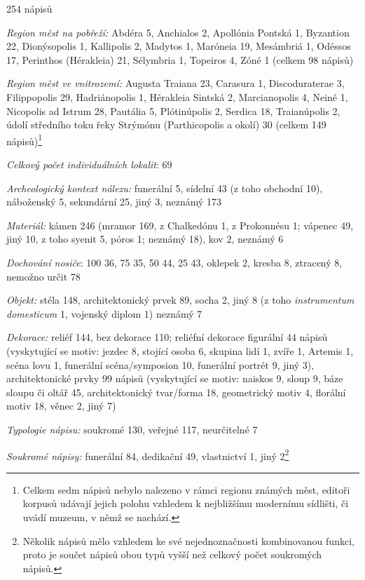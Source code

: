 \placetable[none]{}
\starttable[|l|]
\HL
{} 254 nápisů

{\em Region měst na pobřeží:} Abdéra 5, Anchialos 2, Apollónia Pontská 1, Byzantion 22, Dionýsopolis 1, Kallipolis 2, Madytos 1, Maróneia 19, Mesámbriá 1, Odéssos 17, Perinthos (Hérakleia) 21, Sélymbria 1, Topeiros 4, Zóné 1 (celkem 98 nápisů)

{\em Region měst ve vnitrozemí:} Augusta Traiana 23, Carasura 1, Discoduraterae 3, Filippopolis 29, Hadriánopolis 1, Hérakleia Sintská 2, Marcianopolis 4, Neiné 1, Nicopolis ad Istrum 28, Pautália 5, Plótinúpolis 2, Serdica 18, Traianúpolis 2, údolí středního toku řeky Strýmónu (Parthicopolis a okolí) 30 (celkem 149 nápisů)\footnote{Celkem sedm nápisů nebylo nalezeno v rámci regionu známých měst, editoři korpusů udávají jejich polohu vzhledem k nejbližšímu modernímu sídlišti, či uvádí muzeum, v němž se nachází.}

{\em Celkový počet individuálních lokalit}: 69

{\em Archeologický kontext nálezu:} funerální 5, sídelní 43 (z toho obchodní 10), náboženský 5, sekundární 25, jiný 3, neznámý 173

{\em Materiál:} kámen 246 (mramor 169, z Chalkedónu 1, z Prokonnésu 1; vápenec 49, jiný 10, z toho syenit 5, póros 1; neznámý 18), kov 2, neznámý 6

{\em Dochování nosiče}: 100  36, 75  35, 50  44, 25  43, oklepek 2, kresba 8, ztracený 8, nemožno určit 78

{\em Objekt:} stéla 148, architektonický prvek 89, socha 2, jiný 8 (z toho {\em instrumentum domesticum} 1, vojenský diplom 1) neznámý 7

{\em Dekorace:} reliéf 144, bez dekorace 110; reliéfní dekorace figurální 44 nápisů (vyskytující se motiv: jezdec 8, stojící osoba 6, skupina lidí 1, zvíře 1, Artemis 1, scéna lovu 1, funerální scéna/symposion 10, funerální portrét 9, jiný 3), architektonické prvky 99 nápisů (vyskytující se motiv: naiskos 9, sloup 9, báze sloupu či oltář 45, architektonický tvar/forma 18, geometrický motiv 4, florální motiv 18, věnec 2, jiný 7)

{\em Typologie nápisu:} soukromé 130, veřejné 117, neurčitelné 7

{\em Soukromé nápisy:} funerální 84, dedikační 49, vlastnictví 1, jiný 2\footnote{Několik nápisů mělo vzhledem ke své nejednoznačnosti kombinovanou funkci, proto je součet nápisů obou typů vyšší než celkový počet soukromých nápisů.}

